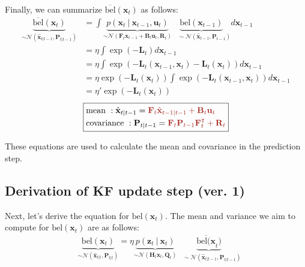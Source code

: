 \documentclass[10pt]{article}
\begin{document}
Finally, we can summarize $\overline{\text{bel}}(\mathbf{x}_{t})$ as follows:
\begin{equation} 
	\begin{aligned} 
		\underbrace{\overline{\text{bel}}(\mathbf{x}_{t})}_{\sim \mathcal{N}(\hat{\mathbf{x}}_{t|t-1}, \mathbf{P}_{t|t-1})  } & = \int \underbrace{p(\mathbf{x}_{t} \ | \ \mathbf{x}_{t-1}, \mathbf{u}_{t})}_{\sim \mathcal{N}(\mathbf{F}_t\mathbf{x}_{t-1}+\mathbf{B}_t \mathbf{u}_t, \mathbf{R}_{t})} \underbrace{\text{bel}(\mathbf{x}_{t-1})}_{\quad \sim \mathcal{N}(\hat{\mathbf{x}}_{t-1}, \mathbf{P}_{t-1})} d \mathbf{x}_{t-1}   \\
		& = \eta \int \exp(-\mathbf{L}_{t}) d \mathbf{x}_{t-1}  \\
		& = \eta \int \exp(-\mathbf{L}_t(\mathbf{x}_{t-1}, \mathbf{x}_t) - \mathbf{L}_t(\mathbf{x}_t)) d \mathbf{x}_{t-1} \\
		& = \eta \exp(-\mathbf{L}_t(\mathbf{x}_t)) \int \exp(-\mathbf{L}_t(\mathbf{x}_{t-1}, \mathbf{x}_t)) d \mathbf{x}_{t-1} \\
		& = \eta' \exp(-\mathbf{L}_t(\mathbf{x}_t)) 
	\end{aligned} 
\end{equation}
\begin{equation} 
	\boxed{ \begin{aligned} 
			& \text{mean } : \hat{\mathbf{x}}_{t|t-1} =  {\color{Mahogany}  \mathbf{F}_t\hat{\mathbf{x}}_{t-1|t-1}+\mathbf{B}_t \mathbf{u}_t }\\
			& \text{covariance }: \mathbf{P}_{t|t-1} = {\color{Mahogany}  \mathbf{F}_t\mathbf{P}_{t-1}\mathbf{F}_t^{\intercal} + \mathbf{R}_t }
	\end{aligned} }
\end{equation}

These equations are used to calculate the mean and covariance in the prediction step.

\subsection{Derivation of KF update step (ver. 1)}
Next, let's derive the equation for ${\text{bel}}(\mathbf{x}_{t})$. The mean and variance we aim to compute for ${\text{bel}}(\mathbf{x}_{t})$ are as follows:
\begin{equation}  
	\begin{aligned} 
		& \underbrace{{\text{bel}}(\mathbf{x}_{t})}_{\sim \mathcal{N}(\hat{\mathbf{x}}_{t|t}, \mathbf{P}_{t|t})  }  = \eta \underbrace{p(\mathbf{z}_{t} \ | \ \mathbf{x}_{t})}_{\sim \mathcal{N}(\mathbf{H}_t\mathbf{x}_{t}, \mathbf{Q}_{t})} \underbrace{\overline{\text{bel}(\mathbf{x}}_{t})}_{\quad \sim \mathcal{N}(\hat{\mathbf{x}}_{t|t-1}, \mathbf{P}_{t|t-1})}   
	\end{aligned} 
\end{equation}
\end{document}
